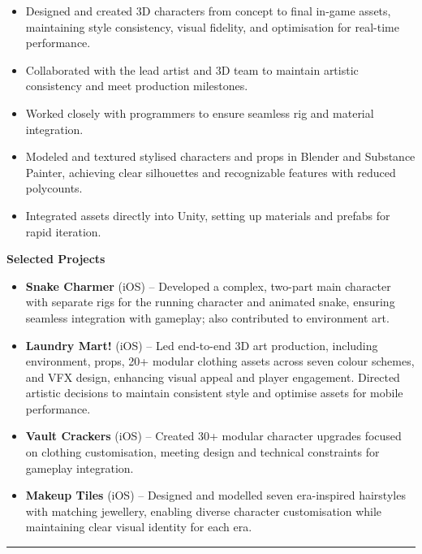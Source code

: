 \documentclass[10pt,a4paper]{altacv}
\begin{document}
\begin{fullwidth}

\begin{itemize}
    \item Designed and created 3D characters from concept to final in-game assets, maintaining style consistency, visual fidelity, and optimisation for real-time performance.
    \item Collaborated with the lead artist and 3D team to maintain artistic consistency and meet production milestones.  
    \item Worked closely with programmers to ensure seamless rig and material integration.
    \item Modeled and textured stylised characters and props in Blender and Substance Painter, achieving clear silhouettes and recognizable features with reduced polycounts.  
    \item Integrated assets directly into Unity, setting up materials and prefabs for rapid iteration. 
\end{itemize}
\textbf{Selected Projects}
\begin{itemize}
    \item \textbf{Snake Charmer} (iOS) – Developed a complex, two-part main character with separate rigs for the running character and animated snake, ensuring seamless integration with gameplay; also contributed to environment art. 
    \item \textbf{Laundry Mart!} (iOS) – Led end-to-end 3D art production, including environment, props, 20+ modular clothing assets across seven colour schemes, and VFX design, enhancing visual appeal and player engagement. Directed artistic decisions to maintain consistent style and optimise assets for mobile performance.  
    \item \textbf{Vault Crackers} (iOS) – Created 30+ modular character upgrades focused on clothing customisation, meeting design and technical constraints for gameplay integration.
    \item \textbf{Makeup Tiles} (iOS) – Designed and modelled seven era-inspired hairstyles with matching jewellery, enabling diverse character customisation while maintaining clear visual identity for each era.
\end{itemize}

{\color{SlateGrey}\rule{\linewidth}{1pt}}


\end{fullwidth}
\end{document}
